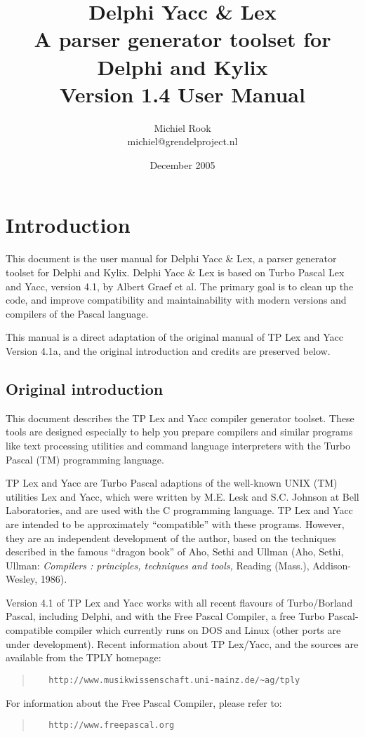 \documentclass[a4paper]{article}
\title{Delphi Yacc \& Lex\\A parser generator toolset for Delphi and Kylix\\
       Version 1.4 User Manual}
\author{Michiel Rook\\michiel@grendelproject.nl}
\date{December 2005}
\begin{document}
\maketitle

\thispagestyle{empty}
\newpage

\pagestyle{plain}
\tableofcontents

\newpage

\pagestyle{fancy}

\section{Introduction}

This document is the user manual for Delphi Yacc \& Lex, a parser
generator toolset for Delphi and Kylix. Delphi Yacc \& Lex is based on 
Turbo Pascal Lex and Yacc, version 4.1, by Albert Graef et al. 
The primary goal is to clean up the code, and improve compatibility and 
maintainability with modern versions and compilers of the Pascal language.

This manual is a direct adaptation of the original manual of
TP Lex and Yacc Version 4.1a, and the original introduction and credits
are preserved below.

\subsection{Original introduction}

This document describes the TP Lex and Yacc compiler generator toolset.
These tools are designed especially to help you prepare compilers and
similar programs like text processing utilities and command language
interpreters with the Turbo Pascal (TM) programming language.

TP Lex and Yacc are Turbo Pascal adaptions of the well-known UNIX (TM)
utilities Lex and Yacc, which were written by M.E. Lesk and S.C. Johnson
at Bell Laboratories, and are used with the C programming language. TP Lex
and Yacc are intended to be approximately ``compatible'' with these programs.
However, they are an independent development of the author, based on the
techniques described in the famous ``dragon book'' of Aho, Sethi and Ullman
(Aho, Sethi, Ullman: {\em Compilers : principles, techniques and tools,\/}
Reading (Mass.), Addison-Wesley, 1986).

Version 4.1 of TP Lex and Yacc works with all recent flavours of Turbo/Borland
Pascal, including Delphi, and with the Free Pascal Compiler, a free Turbo
Pascal-compatible compiler which currently runs on DOS and Linux (other ports
are under development). Recent information about TP Lex/Yacc, and the sources
are available from the TPLY homepage:
\begin{quote}\begin{verbatim}
   http://www.musikwissenschaft.uni-mainz.de/~ag/tply
\end{verbatim}\end{quote}
For information about the Free Pascal Compiler, please refer to:
\begin{quote}\begin{verbatim}
   http://www.freepascal.org
\end{verbatim}\end{quote}
\end{document}
